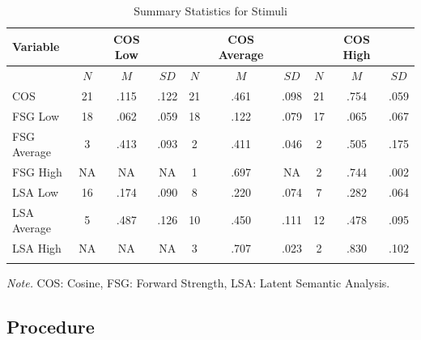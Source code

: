 \documentclass[english,man]{apa6}
\theoremstyle{definition}
\theoremstyle{definition}
\theoremstyle{definition}
\theoremstyle{remark}
\begin{document}
\begin{table}[tbp]
\begin{center}
\begin{threeparttable}
\caption{\label{tab:stim-table}Summary Statistics for Stimuli}
\begin{tabular}{lccccccccc}
\toprule
Variable &   & COS Low &   &   & COS Average &   &   & COS High &  \\
\midrule
 & $N$ & $M$ & $SD$ & $N$ & $M$ & $SD$ & $N$ & $M$ & $SD$\\
COS & 21 & .115 & .122 & 21 & .461 & .098 & 21 & .754 & .059\\
FSG Low & 18 & .062 & .059 & 18 & .122 & .079 & 17 & .065 & .067\\
FSG Average & 3 & .413 & .093 & 2 & .411 & .046 & 2 & .505 & .175\\
FSG High & NA & NA & NA & 1 & .697 & NA & 2 & .744 & .002\\
LSA Low & 16 & .174 & .090 & 8 & .220 & .074 & 7 & .282 & .064\\
LSA Average & 5 & .487 & .126 & 10 & .450 & .111 & 12 & .478 & .095\\
LSA High & NA & NA & NA & 3 & .707 & .023 & 2 & .830 & .102\\
\bottomrule
\addlinespace
\end{tabular}
\begin{tablenotes}[para]
\textit{Note.} COS: Cosine, FSG: Forward Strength, LSA: Latent Semantic Analysis.
\end{tablenotes}
\end{threeparttable}
\end{center}
\end{table}

\subsection{Procedure}\label{procedure}
\end{document}
